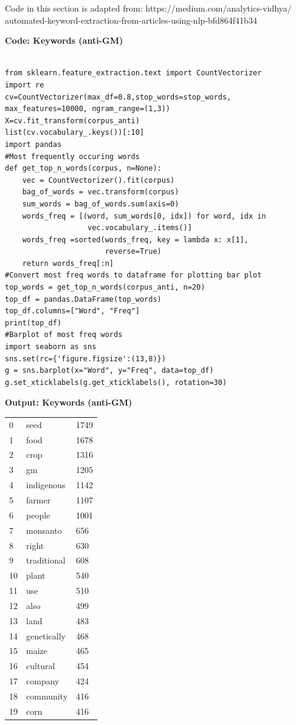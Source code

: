 Code in this section is adapted from:\newline 
\small{https://medium.com/analytics-vidhya/
automated-keyword-extraction-from-articles-using-nlp-bfd864f41b34}

\textbf{Code: Keywords (anti-GM)}

\begin{lstlisting}

from sklearn.feature_extraction.text import CountVectorizer
import re
cv=CountVectorizer(max_df=0.8,stop_words=stop_words,
max_features=10000, ngram_range=(1,3))
X=cv.fit_transform(corpus_anti)
list(cv.vocabulary_.keys())[:10]
import pandas
#Most frequently occuring words
def get_top_n_words(corpus, n=None):
    vec = CountVectorizer().fit(corpus)
    bag_of_words = vec.transform(corpus)
    sum_words = bag_of_words.sum(axis=0) 
    words_freq = [(word, sum_words[0, idx]) for word, idx in      
                   vec.vocabulary_.items()]
    words_freq =sorted(words_freq, key = lambda x: x[1], 
                       reverse=True)
    return words_freq[:n]
#Convert most freq words to dataframe for plotting bar plot
top_words = get_top_n_words(corpus_anti, n=20)
top_df = pandas.DataFrame(top_words)
top_df.columns=["Word", "Freq"]
print(top_df)
#Barplot of most freq words
import seaborn as sns
sns.set(rc={'figure.figsize':(13,8)})
g = sns.barplot(x="Word", y="Freq", data=top_df)
g.set_xticklabels(g.get_xticklabels(), rotation=30)
\end{lstlisting}

\textbf{Output: Keywords (anti-GM)}

\begin{table}[H]
\begin{footnotesize}
\begin{tabular}{lll}
0  & seed        & 1749 \\
1  & food        & 1678 \\
2  & crop        & 1316 \\
3  & gm          & 1205 \\
4  & indigenous  & 1142 \\
5  & farmer      & 1107 \\
6  & people      & 1001 \\
7  & monsanto    & 656  \\
8  & right       & 630  \\
9  & traditional & 608  \\
10 & plant       & 540  \\
11 & use         & 510  \\
12 & also        & 499  \\
13 & land        & 483  \\
14 & genetically & 468  \\
15 & maize       & 465  \\
16 & cultural    & 454  \\
17 & company     & 424  \\
18 & community   & 416  \\
19 & corn        & 416 
\end{tabular}
\end{footnotesize}
\end{table}

